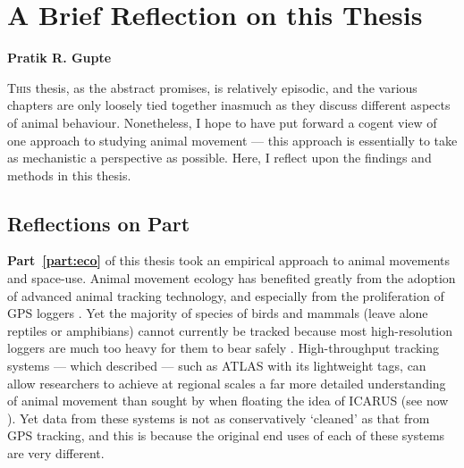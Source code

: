 
%
\chapter{A Brief Reflection on this Thesis}\label{ch:discussion}

{\noindent \textbf{Pratik R. Gupte}}

\lettrine{T}{his} thesis, as the abstract promises, is relatively episodic, and the various chapters are only loosely tied together inasmuch as they discuss different aspects of animal behaviour.
Nonetheless, I hope to have put forward a cogent view of one approach to studying animal movement --- this approach is essentially to take as mechanistic a perspective as possible.
Here, I reflect upon the findings and methods in this thesis.

\section*{Reflections on Part~}

\textbf{Part~\ref{part:eco}} of this thesis took an empirical approach to animal movements and space-use.
Animal movement ecology has benefited greatly from the adoption of advanced animal tracking technology, and especially from the proliferation of GPS loggers \citep{cagnacci2010}.
Yet the majority of species of birds and mammals (leave alone reptiles or amphibians) cannot currently be tracked because most high-resolution loggers are much too heavy for them to bear safely \parencite{kays2015}.
High-throughput tracking systems --- which \textcite{nathan2022} described --- such as ATLAS with its lightweight tags, can allow researchers to achieve at regional scales a far more detailed understanding of animal movement than sought by \textcite{wikelski2007} when floating the idea of ICARUS (see now \cite{jetz2022}).
Yet data from these systems is not as conservatively `cleaned' as that from GPS tracking, and this is because the original end uses of each of these systems are very different.

